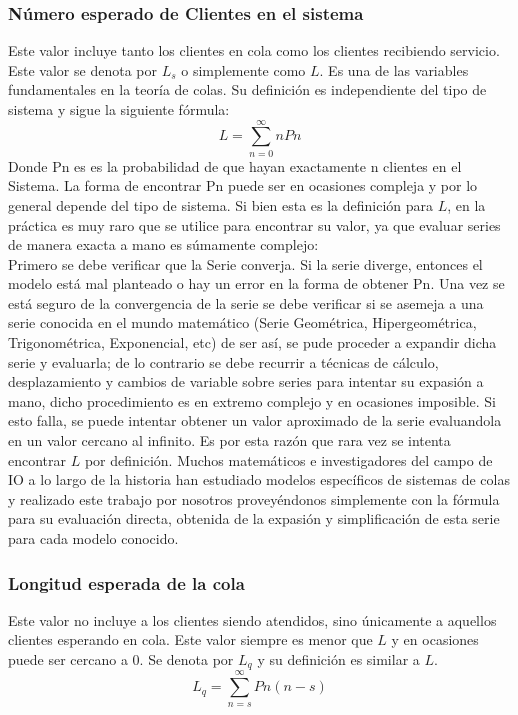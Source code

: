 \documentclass{article}
\begin{document}
\subsubsection{Número esperado de Clientes en el sistema}
Este valor incluye tanto los clientes en cola como los clientes recibiendo servicio.
Este valor se denota por $L_{s}$ o simplemente como $L$. Es una de las
variables fundamentales en la teoría de colas. Su definición es independiente
del tipo de sistema y sigue la siguiente fórmula:
\begin{equation}
	\label{eq1:lsDef}
	L = \sum_{n=0}^{\infty} n Pn
\end{equation}
Donde Pn es es la probabilidad de que hayan exactamente n clientes en el Sistema.
La forma de encontrar Pn puede ser en ocasiones compleja 
y por lo general depende del tipo de 
sistema. Si bien esta es la definición para $L$, en la práctica es muy raro que 
se utilice para encontrar su valor, ya que evaluar series de manera exacta a  mano
es súmamente complejo: \\
Primero se debe verificar que la Serie converja. Si la serie diverge, entonces
el modelo está mal planteado o hay un error en la forma de obtener Pn. 
Una vez se está seguro de la convergencia de la serie se debe verificar si 
se asemeja a una serie conocida en el mundo matemático (Serie Geométrica, Hipergeométrica, Trigonométrica, Exponencial, etc) de ser así, se pude proceder a expandir dicha
serie y evaluarla; de lo contrario se debe recurrir a técnicas de cálculo, 
desplazamiento y cambios de variable sobre series para intentar su expasión a mano, 
dicho procedimiento es en extremo complejo y en ocasiones imposible. Si esto falla, 
se puede intentar obtener un valor aproximado de la serie evaluandola en un 
valor cercano al infinito. Es por esta razón que rara vez se intenta encontrar $L$ por
definición. Muchos matemáticos e investigadores del campo de IO a lo largo de la
historia han estudiado modelos específicos de sistemas de colas y 
realizado este trabajo por nosotros proveyéndonos simplemente con la fórmula 
para su evaluación directa, obtenida de la expasión y simplificación de esta 
serie para cada modelo conocido.
\subsubsection{Longitud esperada de la cola}
Este valor no incluye a los clientes siendo atendidos, sino únicamente a aquellos 
clientes esperando en cola. Este valor siempre es menor que $L$ y en ocasiones
puede ser cercano a 0. Se denota por $L_{q}$ y su definición es similar a $L$. 
\begin{equation}
	\label{eq2:lqDef}
	L_{q} = \sum_{n=s}^{\infty} Pn \left(n - s\right)	
\end{equation}
\end{document}
